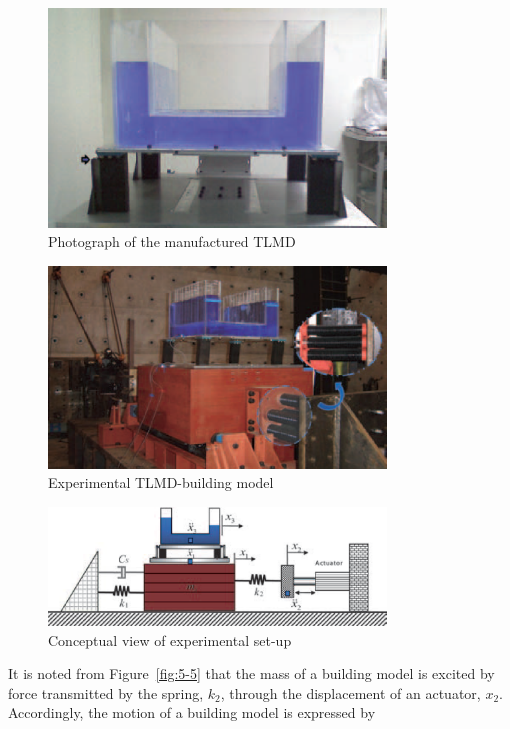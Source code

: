 \begin{figure}[ht]
\centering
\includegraphics[width=0.8\textwidth] {figure/5-2.eps}
\caption{Photograph of the manufactured TLMD}
\label{fig:5-2}
\end{figure}

\begin{figure}[ht]
\centering
\includegraphics[width=0.8\textwidth] {figure/5-3.eps}
\caption{Experimental TLMD-building model}
\label{fig:5-3}
\end{figure}

\begin{figure}[ht]
\centering
\includegraphics[width=0.8\textwidth] {figure/5-4.eps}
\caption{Conceptual view of experimental set-up}
\label{fig:5-4}
\end{figure}

It is noted from Figure~\ref{fig:5-5} that the mass of a building model is excited by force transmitted by the spring, $k_{2}$, through the displacement of an actuator, $x_{2}$. Accordingly, the motion of a building model is expressed by

